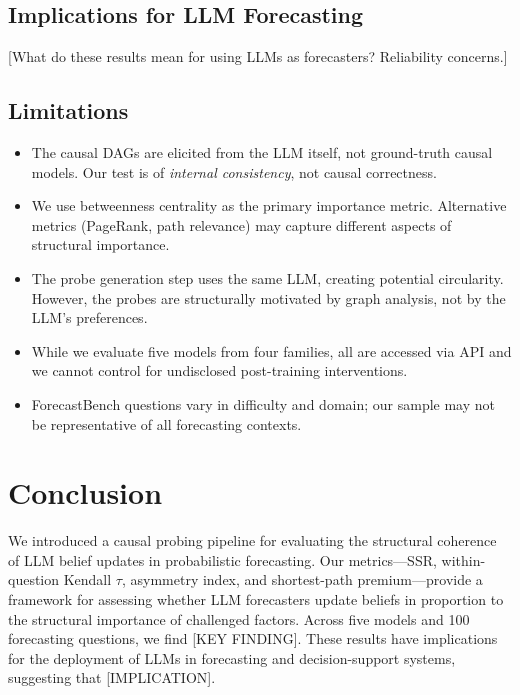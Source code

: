 \documentclass[11pt]{article}
\begin{document}
\subsection{Implications for LLM Forecasting}

[What do these results mean for using LLMs as forecasters? Reliability concerns.]

\subsection{Limitations}

\begin{itemize}
    \item The causal DAGs are elicited from the LLM itself, not ground-truth causal models. Our test is of \textit{internal consistency}, not causal correctness.
    \item We use betweenness centrality as the primary importance metric. Alternative metrics (PageRank, path relevance) may capture different aspects of structural importance.
    \item The probe generation step uses the same LLM, creating potential circularity. However, the probes are structurally motivated by graph analysis, not by the LLM's preferences.
    \item While we evaluate five models from four families, all are accessed via API and we cannot control for undisclosed post-training interventions.
    \item ForecastBench questions vary in difficulty and domain; our sample may not be representative of all forecasting contexts.
\end{itemize}

\section{Conclusion}
\label{sec:conclusion}


We introduced a causal probing pipeline for evaluating the structural coherence of LLM belief updates in probabilistic forecasting. Our metrics---SSR, within-question Kendall $\tau$, asymmetry index, and shortest-path premium---provide a framework for assessing whether LLM forecasters update beliefs in proportion to the structural importance of challenged factors. Across five models and 100 forecasting questions, we find [KEY FINDING]. These results have implications for the deployment of LLMs in forecasting and decision-support systems, suggesting that [IMPLICATION].
\end{document}
